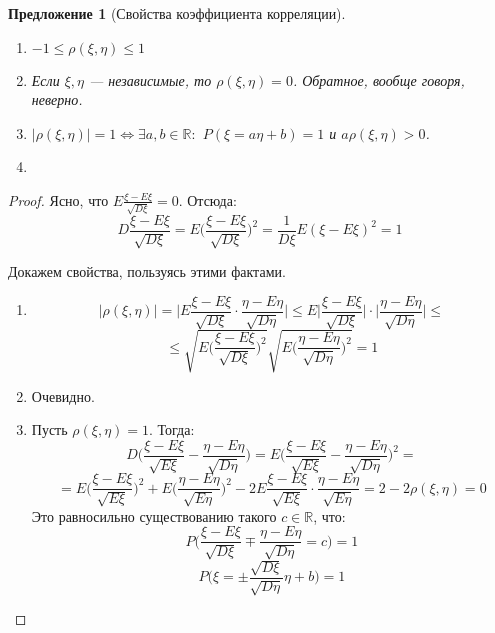 \documentclass[11pt,openany,a4paper]{scrartcl}
\theoremstyle{plain}
\newtheorem{proposition}[theorem]{Предложение}
\theoremstyle{definition}
\newcommand\mb{\mathbb}
\newcommand\real{\mb R}
\begin{document}
\begin{proposition}[Свойства коэффициента корреляции]
\mbox{}
    \begin{enumerate}
        \item $-1 \leqslant \rho(\xi, \eta) \leqslant 1$
        \item Если $\xi, \eta$ — независимые, то $\rho(\xi, \eta) = 0$. Обратное,
        вообще говоря, неверно.
        \item $|\rho(\xi, \eta)| = 1 \iff \exists a,b \in \real:$
        $P(\xi = a\eta + b) = 1$ и $a\rho(\xi, \eta) > 0$.
        \item 
    \end{enumerate}
\end{proposition}
\begin{proof}
    Ясно, что $E\frac{\xi - E\xi}{\sqrt{D\xi}} = 0$. Отсюда:
    $$
    D\frac{\xi - E\xi}{\sqrt{D\xi}} =
    E\bigg(\frac{\xi - E\xi}{\sqrt{D\xi}}\bigg)^2 =
    \frac{1}{D\xi}E(\xi - E\xi)^2 = 1
    $$
    
    Докажем свойства, пользуясь этими фактами.
    \begin{enumerate}
        \item
        $$
        |\rho(\xi, \eta)| = \bigg|E\frac{\xi - E\xi}{\sqrt{D\xi}}\cdot
        \frac{\eta - E\eta}{\sqrt{D\eta}}\bigg| \leqslant
        E\bigg|\frac{\xi - E\xi}{\sqrt{D\xi}}\bigg|\cdot
        \bigg|\frac{\eta - E\eta}{\sqrt{D\eta}}\bigg| \leqslant
        $$
        $$
        \leqslant
        \sqrt{E\bigg(\frac{\xi - E\xi}{\sqrt{D\xi}}\bigg)^2}
        \sqrt{E\bigg(\frac{\eta - E\eta}{\sqrt{D\eta}}\bigg)^2} = 1
        $$
        \item Очевидно.
        \item Пусть $\rho(\xi, \eta) = 1$. Тогда:
        $$
        D\bigg(\frac{\xi - E\xi}{\sqrt{E\xi}} -
        \frac{\eta - E\eta}{\sqrt{D\eta}}\bigg) =
        E\bigg(\frac{\xi - E\xi}{\sqrt{E\xi}} -
        \frac{\eta - E\eta}{\sqrt{D\eta}}\bigg)^2 =
        $$
        $$
        =
        E\bigg(\frac{\xi - E\xi}{\sqrt{E\xi}}\bigg)^2 +
        E\bigg(\frac{\eta - E\eta}{\sqrt{E\eta}}\bigg)^2 -
        2E\frac{\xi - E\xi}{\sqrt{E\xi}} \cdot \frac{\eta - E\eta}{\sqrt{E\eta}} =
        2 - 2\rho(\xi, \eta) = 0
        $$
        Это равносильно существованию такого $c \in \real$, что:
        $$
        P\bigg(\frac{\xi - E\xi}{\sqrt{D\xi}}\mp
        \frac{\eta - E\eta}{\sqrt{D\eta}} = c\bigg) = 1
        $$
        $$
        P\bigg(\xi = \pm\frac{\sqrt{D\xi}}{\sqrt{D\eta}}\eta + b\bigg) = 1
        $$
    \end{enumerate}
\end{proof}
\end{document}
